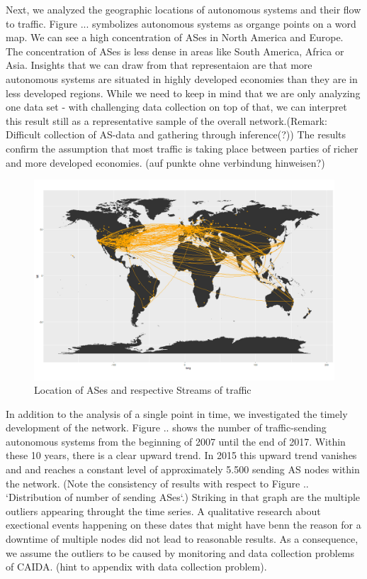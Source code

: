 \documentclass[conference]{IEEEtran}
\begin{document}
Next, we analyzed the geographic locations of autonomous systems and their flow to traffic. Figure ... symbolizes autonomous systems as organge points on a word map. We can see a high concentration of ASes in North America and Europe. The concentration of ASes is less dense in areas like South America, Africa or Asia. Insights that we can draw from that representaion are that more autonomous systems are situated in highly developed economies  than they are in less developed regions. While we need to keep in mind that we are only analyzing one data set - with challenging data collection on top of that, we can interpret this result still as a representative sample of the overall network.(Remark: Difficult collection of AS-data and gathering through inference(?)) The results confirm the assumption that most traffic is taking place between parties of richer and more developed economies.  (auf punkte ohne verbindung hinweisen?)



\begin{figure}[htbp]
\centerline{\includegraphics[scale=0.2]{Graphics/connectedASes.png}}
\caption{Location of ASes and respective Streams of traffic}
\label{fig}
\end{figure}

In addition to the analysis of a single point in time, we investigated the timely development of the network. Figure .. shows the number of traffic-sending autonomous systems from the beginning of 2007 until the end of 2017. Within these 10 years, there is a clear upward trend. In 2015 this upward trend vanishes and and reaches a constant level of approximately 5.500 sending AS nodes within the network. (Note the consistency of results with respect to Figure .. `Distribution of number of sending ASes`.) Striking in that graph are the multiple outliers appearing throught the time series. A qualitative research about exectional events happening on these dates that might have benn the reason for a downtime of multiple nodes did not lead to reasonable results. As a consequence, we assume the outliers to be caused by monitoring and data collection problems of CAIDA. (hint to appendix with data collection problem).
\end{document}
